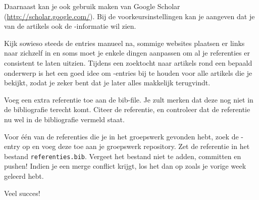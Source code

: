 \documentclass[12pt, dutch]{article}
\begin{document}
Daarnaast kan je ook gebruik maken van Google Scholar
(\url{http://scholar.google.com/}). Bij de voorkeursinstellingen kan
je aangeven dat je van de artikels ook de \BibTeX-informatie wil zien.

Kijk sowieso steeds de entries manueel na, sommige websites plaatsen
er links naar zichzelf in en soms moet je enkele dingen aanpassen om
al je referenties er consistent te laten uitzien. Tijdens een
zoektocht naar artikels rond een bepaald onderwerp is het een goed
idee om \BibTeX-entries bij te houden voor alle artikels die je
bekijkt, zodat je zeker bent dat je later alles makkelijk terugvindt.

\begin{tcolorbox}[title=Opgave 6c]
  Voeg een extra referentie toe aan de bib-file. Je zult merken dat deze nog
  niet in de bibliografie terecht komt. Citeer de referentie, en controleer
  dat de referentie nu wel in de bibliografie vermeld staat.
\end{tcolorbox}

\begin{tcolorbox}[title=Opgave 6d]
  Voor één van de referenties die je in het groepswerk gevonden hebt, zoek de
  \BibTeX-entry op en voeg deze toe aan je groepswerk repository. Zet de
  referentie in het bestand \texttt{referenties.bib}. Vergeet het bestand niet
  te adden, committen en pushen! Indien je een merge conflict krijgt, los het
  dan op zoals je vorige week geleerd hebt.
\end{tcolorbox}

Veel succes!

\end{document}

